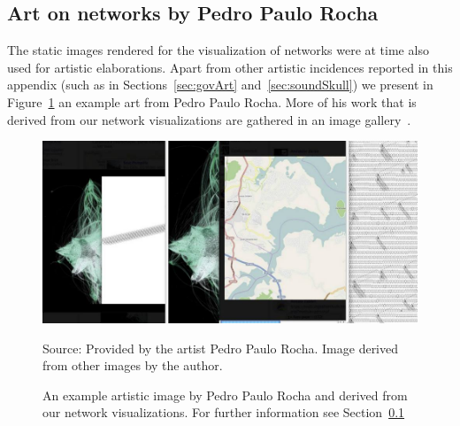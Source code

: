 \begin{apendicesenv}
	\subsection{Art on networks by Pedro Paulo Rocha}\label{sec:ppr}
	The static images rendered for the visualization of networks were at time also used for artistic elaborations.
	Apart from other artistic incidences reported in this appendix (such as in Sections~\ref{sec:govArt} and~\ref{sec:soundSkull})
	we present in Figure~\ref{fig:ppr} an example art from Pedro Paulo Rocha.
	More of his work that is derived from our network visualizations are gathered in an image gallery~\cite{pprGal}.
\begin{figure}[h!]
\begin{center}
\includegraphics[scale=.45]{figs/ppr}
\caption{An example artistic image by Pedro Paulo Rocha and derived from our network visualizations.
	For further information see Section~\ref{sec:ppr}}
\label{fig:ppr}
\begin{flushleft}\footnotesize
Source: Provided by the artist Pedro Paulo Rocha. Image derived from other images by the author.\
\end{flushleft}
\end{center}
\end{figure}


\end{apendicesenv}
